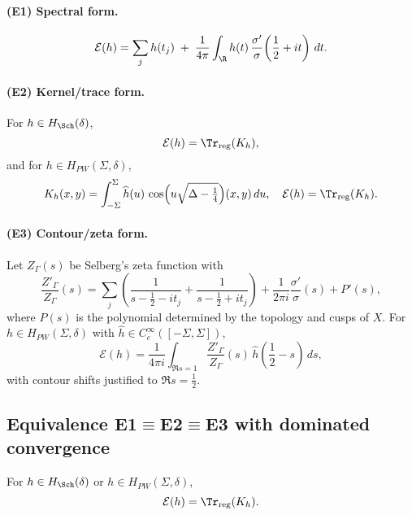 \paragraph*{(E1) Spectral form.}
\[
  \mathcal{E}(h) = \sum_{j} h(t_j)
   \;+\; \frac{1}{4\pi}\int_{\R} h(t)\,
          \frac{\sigma'}{\sigma}\!\left(\frac12+it\right)\,dt.
\]

\paragraph*{(E2) Kernel/trace form.}
For $h\in H_{\Sch}(\delta)$,
\[
  \mathcal{E}(h)=\Tr_{\mathrm{reg}}(K_h),
\]
and for $h\in H_{PW}(\Sigma,\delta)$,
\[
  K_h(x,y) = \int_{-\Sigma}^{\Sigma} \widehat h(u)\,
             \cos\!\Big(u\sqrt{\Delta-\tfrac14}\Big)(x,y)\,du,
\quad
  \mathcal{E}(h)=\Tr_{\mathrm{reg}}(K_h).
\]

\paragraph*{(E3) Contour/zeta form.}
Let $Z_\Gamma(s)$ be Selberg's zeta function with
\begin{equation}\label{eq:Zprime-structure}
  \frac{Z'_\Gamma}{Z_\Gamma}(s)
  = \sum_{j}\!\left(\frac{1}{s-\tfrac12-it_j}+\frac{1}{s-\tfrac12+it_j}\right)
    + \frac{1}{2\pi i}\frac{\sigma'}{\sigma}(s) + P'(s),
\end{equation}
where $P(s)$ is the polynomial determined by the topology and cusps of $X$.
For $h\in H_{PW}(\Sigma,\delta)$ with $\widehat h\in C_c^\infty([-\Sigma,\Sigma])$,
\begin{equation}\label{eq:contour-form}
  \mathcal{E}(h)
  = \frac{1}{4\pi i}\int_{\Re s=1}
      \frac{Z'_\Gamma}{Z_\Gamma}(s)\,
      \widehat h\!\left(\frac12 - s\right)\,ds,
\end{equation}
with contour shifts justified to $\Re s=\frac12$.

\subsection{Equivalence \texorpdfstring{E1$\boldsymbol{\equiv}$E2$\boldsymbol{\equiv}$E3}{E1≡E2≡E3} with dominated convergence}
\label{subsec:part3-equivalence}

\begin{theorem}[E1 $\equiv$ E2]
\label{thm:E1E2}
For $h\in H_{\Sch}(\delta)$ or $h\in H_{PW}(\Sigma,\delta)$,
\[
  \mathcal{E}(h) = \Tr_{\mathrm{reg}}(K_h).
\]
\end{theorem}

